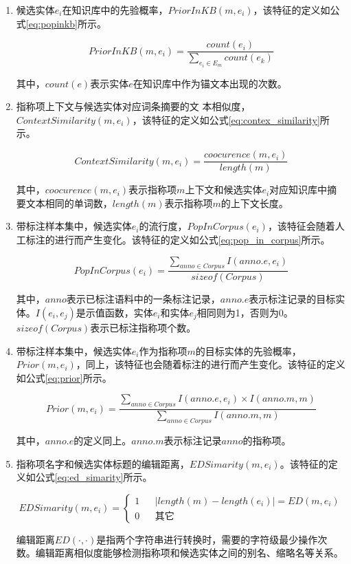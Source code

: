 \begin{enumerate}
	\renewcommand{\labelenumi}{(\theenumi)}
	\item {候选实体$e_i$在知识库中的先验概率，$PriorInKB(m,e_i)$，该特征的定义如公式\ref{eq:popinkb}所示。
		
		\begin{equation}\label{eq:popinkb}
		PriorInKB(m,e_i)=\frac{count(e_i)}{\sum_{e_i\in E_m} {count(e_k)}}
		\end{equation}
		
		其中，$count(e)$表示实体$e$在知识库中作为锚文本出现的次数。
	}
	\item {指称项上下文与候选实体对应词条摘要的文 本相似度，$ContextSimilarity(m,e_i)$，该特征的定义如公式\ref{eq:contex_similarity}所示。
		
		\begin{equation}\label{eq:contex_similarity}
		ContextSimilarity(m,e_i)=\frac{coocurence(m,e_i)}{length(m)}
		\end{equation}
		
		其中，$coocurence(m,e_i)$表示指称项$m$上下文和候选实体$e_i$对应知识库中摘要文本相同的单词数，$length(m)$表示指称项$m$的上下文长度。
	}
	\item {带标注样本集中，候选实体$e_i$的流行度，$PopInCorpus(e_i)$，该特征会随着人工标注的进行而产生变化。该特征的定义如公式\ref{eq:pop_in_corpus}所示。
		
		\begin{equation}\label{eq:pop_in_corpus}
		PopInCorpus(e_i)=\frac{\sum_{anno \in Corpus} {I(anno.e,e_i)}}{sizeof(Corpus)}
		\end{equation}
		
		其中，$anno$表示已标注语料中的一条标注记录，$anno.e$表示标注记录的目标实体。$I(e_i,e_j)$是示值函数，实体$e_i$和实体$e_j$相同则为1，否则为0。$sizeof(Corpus)$表示已标注指称项个数。
	}
	\item{带标注样本集中，候选实体$e_i$作为指称项$m$的目标实体的先验概率，$Prior(m,e_i)$，同上，该特征也会随着标注的进行而产生变化。该特征的定义如公式\ref{eq:prior}所示。
		
		\begin{equation}\label{eq:prior}
		Prior(m,e_i)=\frac{\sum_{anno \in Corpus} {I(anno.e,e_i)\times I(anno.m,m)}}{\sum_{anno \in Corpus} {I(anno.m,m)}}
		\end{equation}
		
		其中，$anno.e$的定义同上。$anno.m$表示标注记录$anno$的指称项。
	}
	\item 指称项名字和候选实体标题的编辑距离，$EDSimarity(m,e_i)$。该特征的定义如公式\ref{eq:ed_simarity}所示。
	
	\begin{equation}\label{eq:ed_simarity}
	EDSimarity(m,e_i)=
	\left\{
	\begin{array}{rcl}
	1       &      & {|length(m)-length(e_i)|=ED(m,e_i)}\\
	0    &      & {\text{其它}}
	\end{array} \right.
	\end{equation}
	
	编辑距离$ED(\cdot,\cdot)$是指两个字符串进行转换时，需要的字符级最少操作次数。编辑距离相似度能够检测指称项和候选实体之间的别名、缩略名等关系。
\end{enumerate}

